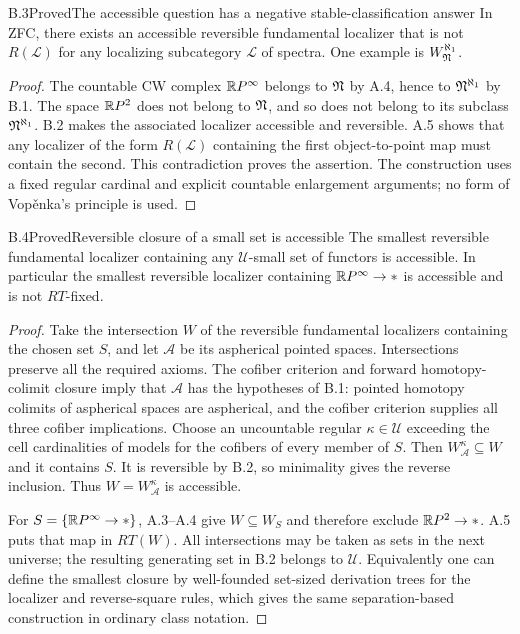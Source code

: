 \begin{claim}{B.3}{Proved}{The accessible question has a negative stable-classification answer}\label{B3}
In ZFC, there exists an accessible reversible fundamental localizer that is not $R(\mathcal L)$ for any localizing subcategory $\mathcal L$ of spectra. One example is $W^{\aleph_1}_{\mathfrak N}$.
\end{claim}
\begin{proof}
The countable CW complex $\mathbb{R}P^\infty$ belongs to $\mathfrak N$ by A.4, hence to $\mathfrak N^{\aleph_1}$ by B.1. The space $\mathbb{R}P^2$ does not belong to $\mathfrak N$, and so does not belong to its subclass $\mathfrak N^{\aleph_1}$. B.2 makes the associated localizer accessible and reversible. A.5 shows that any localizer of the form $R(\mathcal L)$ containing the first object-to-point map must contain the second. This contradiction proves the assertion. The construction uses a fixed regular cardinal and explicit countable enlargement arguments; no form of Vop\v enka's principle is used.
\end{proof}

\begin{claim}{B.4}{Proved}{Reversible closure of a small set is accessible}\label{B4}
The smallest reversible fundamental localizer containing any $\mathcal U$-small set of functors is accessible. In particular the smallest reversible localizer containing $\mathbb{R}P^\infty\to *$ is accessible and is not $RT$-fixed.
\end{claim}
\begin{proof}
Take the intersection $W$ of the reversible fundamental localizers containing the chosen set $S$, and let $\mathcal A$ be its aspherical pointed spaces. Intersections preserve all the required axioms. The cofiber criterion and forward homotopy-colimit closure imply that $\mathcal A$ has the hypotheses of B.1: pointed homotopy colimits of aspherical spaces are aspherical, and the cofiber criterion supplies all three cofiber implications. Choose an uncountable regular $\kappa\in\mathcal U$ exceeding the cell cardinalities of models for the cofibers of every member of $S$. Then $W^\kappa_{\mathcal A}\subseteq W$ and it contains $S$. It is reversible by B.2, so minimality gives the reverse inclusion. Thus $W=W^\kappa_{\mathcal A}$ is accessible.

For $S=\{\mathbb{R}P^\infty\to *\}$, A.3--A.4 give $W\subseteq W_S$ and therefore exclude $\mathbb{R}P^2\to *$. A.5 puts that map in $RT(W)$. All intersections may be taken as sets in the next universe; the resulting generating set in B.2 belongs to $\mathcal U$. Equivalently one can define the smallest closure by well-founded set-sized derivation trees for the localizer and reverse-square rules, which gives the same separation-based construction in ordinary class notation.
\end{proof}
